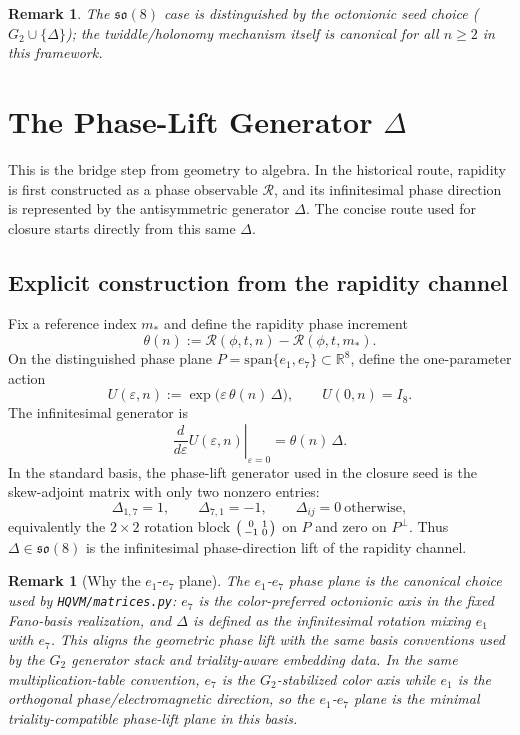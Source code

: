 \documentclass[11pt]{amsart}
\newtheorem{remark}[theorem]{Remark}
\begin{document}
\begin{remark}
The \(\mathfrak{so}(8)\) case is distinguished by the octonionic seed choice (\(G_2\cup\{\Delta\}\)); the twiddle/holonomy mechanism itself is canonical for all \(n\ge 2\) in this framework.
\end{remark}

\section{The Phase-Lift Generator \texorpdfstring{$\Delta$}{Delta}}

This is the bridge step from geometry to algebra. In the historical route, rapidity is first constructed as a phase observable \(\mathcal R\), and its infinitesimal phase direction is represented by the antisymmetric generator \(\Delta\). The concise route used for closure starts directly from this same \(\Delta\).

\subsection*{Explicit construction from the rapidity channel}
Fix a reference index \(m_\ast\) and define the rapidity phase increment
\[
\theta(n):=\mathcal R(\phi,t,n)-\mathcal R(\phi,t,m_\ast).
\]
On the distinguished phase plane \(P=\mathrm{span}\{e_1,e_7\}\subset\mathbb R^8\), define the one-parameter action
\[
U(\varepsilon,n):=\exp\!\bigl(\varepsilon\,\theta(n)\,\Delta\bigr),\qquad U(0,n)=I_8.
\]
The infinitesimal generator is
\[
\left.\frac{d}{d\varepsilon}U(\varepsilon,n)\right|_{\varepsilon=0}
=\theta(n)\,\Delta.
\]
In the standard basis, the phase-lift generator used in the closure seed is the skew-adjoint matrix with only two nonzero entries:
\[
\Delta_{1,7}=1,\qquad \Delta_{7,1}=-1,\qquad \Delta_{ij}=0\ \text{otherwise},
\]
equivalently the \(2\times2\) rotation block
\(
\begin{psmallmatrix}0&1\\-1&0\end{psmallmatrix}
\)
on \(P\) and zero on \(P^\perp\). Thus \(\Delta\in\mathfrak{so}(8)\) is the infinitesimal phase-direction lift of the rapidity channel.

\begin{remark}[Why the \(e_1\)-\(e_7\) plane]
The \(e_1\)-\(e_7\) phase plane is the canonical choice used by \texttt{HQVM/matrices.py}: \(e_7\) is the color-preferred octonionic axis in the fixed Fano-basis realization, and \(\Delta\) is defined as the infinitesimal rotation mixing \(e_1\) with \(e_7\). This aligns the geometric phase lift with the same basis conventions used by the \(G_2\) generator stack and triality-aware embedding data.
In the same multiplication-table convention, \(e_7\) is the \(G_2\)-stabilized color axis while \(e_1\) is the orthogonal phase/electromagnetic direction, so the \(e_1\)-\(e_7\) plane is the minimal triality-compatible phase-lift plane in this basis.
\end{remark}
\end{document}
